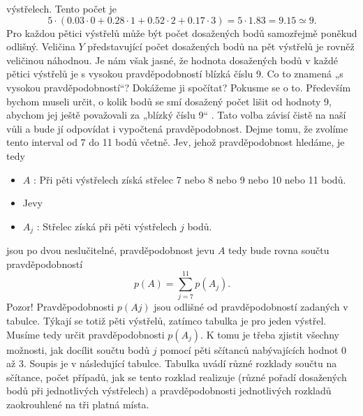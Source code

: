 \begin{example}
  výstřelech. Tento počet je
  \begin{equation*}
    5\cdot(\num{0.03}\cdot0 + \num{0.28}\cdot1 + \num{0.52}\cdot2 + \num{0.17}\cdot3) = 
    5\cdot\num{1.83} = \num{9.15} \simeq 9.
  \end{equation*}
  Pro každou pětici výstřelů může být počet dosažených bodů samozřejmě poněkud odlišný. Veličina 
  \(Y\) představující počet dosažených bodů na pět výstřelů je rovněž veličinou náhodnou. Je nám 
  však jasné, že hodnota dosažených bodů v každé pětici výstřelů je s vysokou pravděpodobností 
  blízká číslu 9. Co to znamená „s vysokou pravděpodobností“? Dokážeme ji spočítat? Pokusme se o 
  to. Především bychom museli určit, o kolik bodů se smí dosažený počet lišit od hodnoty 9, abychom 
  jej ještě považovali za „blízký číslu 9“ . Tato volba závisí čistě na naší vůli a bude jí 
  odpovídat i vypočtená pravděpodobnost. Dejme tomu, že zvolíme tento interval od 7 do 11 bodů 
  včetně. Jev, jehož pravděpodobnost hledáme, je tedy
  \begin{itemize}
    \item \(A\) : Při pěti výstřelech získá střelec \num{7} nebo \num{8} nebo \num{9} nebo \num{10} 
          nebo \num{11} bodů.
    \item[] Jevy
    \item \(A_j\) : Střelec získá při pěti výstřelech \(j\) bodů.
  \end{itemize}
  jsou po dvou neslučitelné, pravděpodobnost jevu \(A\) tedy bude rovna součtu pravděpodobností
  \begin{equation*}
    p(A) = \sum_{j=7}^{11} p(A_j).
  \end{equation*}
  Pozor! Pravděpodobnosti \(p(Aj)\) jsou odlišné od pravděpodobností zadaných v tabulce. Týkají se 
  totiž pěti výstřelů, zatímco tabulka je pro jeden výstřel. Musíme tedy určit pravděpodobnosti 
  \(p(A_j)\). K tomu je třeba zjistit všechny možnosti, jak docílit součtu bodů \(j\) pomocí pěti 
  sčítanců nabývajících hodnot \num{0} až \num{3}. Soupis je v následující tabulce. Tabulka uvádí 
  různé rozklady součtu na sčítance, počet případů, jak se tento rozklad realizuje (různé pořadí 
  dosažených bodů při jednotlivých výstřelech) a pravděpodobnosti jednotlivých rozkladů
  zaokrouhlené na tři platná místa.
  

\end{example}
